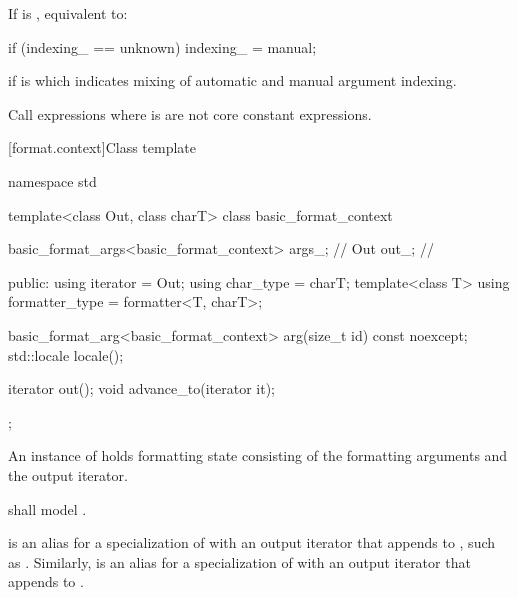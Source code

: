 \begin{itemdescr}
\pnum
\effects
If  is , equivalent to:
\begin{codeblock}
if (indexing_ == unknown)
  indexing_ = manual;
\end{codeblock}

\pnum
\throws
{} if
 is 
which indicates mixing of automatic and manual argument indexing.

\pnum
\remarks
Call expressions where  is  are not
core constant expressions.
\end{itemdescr}

[format.context]{Class template }

%
%
%
%
\begin{codeblock}
namespace std {
  template<class Out, class charT>
  class basic_format_context {
    basic_format_args<basic_format_context> args_;      // \expos
    Out out_;                                           // \expos

  public:
    using iterator = Out;
    using char_type = charT;
    template<class T> using formatter_type = formatter<T, charT>;

    basic_format_arg<basic_format_context> arg(size_t id) const noexcept;
    std::locale locale();

    iterator out();
    void advance_to(iterator it);
  };
}
\end{codeblock}

\pnum
An instance of  holds formatting state
consisting of the formatting arguments and the output iterator.

\pnum
{} shall model .

\pnum
{}%
 is an alias for
a specialization of 
with an output iterator
that appends to ,
such as .
%
Similarly,  is an alias for
a specialization of 
with an output iterator
that appends to .

